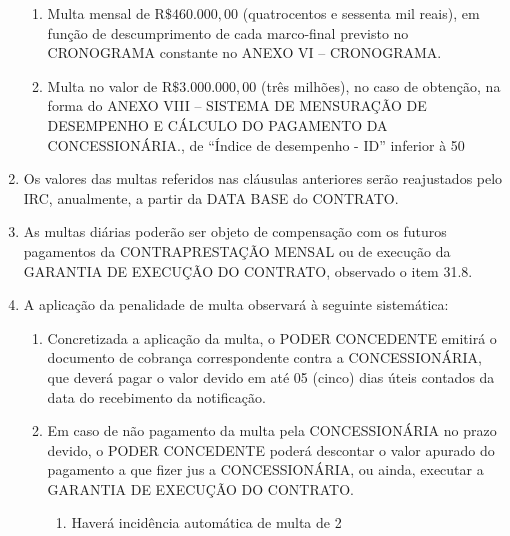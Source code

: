 \documentclass[a4paper,11pt]{report} %
\begin{document}
\begin{enumerate}
\begin{enumerate}[label*=\arabic*.]
\item \label{itm:ESX7} Multa mensal de R$\$ 460.000,00$ (quatrocentos e sessenta mil reais), em função de descumprimento de cada marco-final previsto no CRONOGRAMA constante no ANEXO VI – CRONOGRAMA.

\item \label{itm:NJDQ} Multa no valor de R$\$ 3.000.000,00$ (três milhões), no caso de obtenção, na forma do ANEXO VIII – SISTEMA DE MENSURAÇÃO DE DESEMPENHO E CÁLCULO DO PAGAMENTO DA CONCESSIONÁRIA., de “Índice de desempenho - ID” inferior à 50%
\end{enumerate}

\item \label{itm:JWAB} Os valores das multas referidos nas cláusulas anteriores serão reajustados pelo IRC, anualmente, a partir da DATA BASE do CONTRATO.
\item \label{itm:M7GT} As multas diárias poderão ser objeto de compensação com os futuros pagamentos da CONTRAPRESTAÇÃO MENSAL ou de execução da GARANTIA DE EXECUÇÃO DO CONTRATO, observado o item 31.8.

\item \label{itm:Y8H2} A aplicação da penalidade de multa observará à seguinte sistemática:

\begin{enumerate}[label*=\arabic*.]
\item \label{itm:NRBL} Concretizada a aplicação da multa, o PODER CONCEDENTE emitirá o documento de cobrança correspondente contra a CONCESSIONÁRIA, que deverá pagar o valor devido em até 05 (cinco) dias úteis contados da data do recebimento da notificação.

\item \label{itm:7DYT} Em caso de não pagamento da multa pela CONCESSIONÁRIA no prazo devido, o PODER CONCEDENTE poderá descontar o valor apurado do pagamento a que fizer jus a CONCESSIONÁRIA, ou ainda, executar a GARANTIA DE EXECUÇÃO DO CONTRATO.

\begin{enumerate}[label*=\arabic*.]
\item \label{itm:MM8G} Haverá incidência automática de multa de 2%
\end{enumerate}


\end{enumerate}
\end{enumerate}
\end{document}
